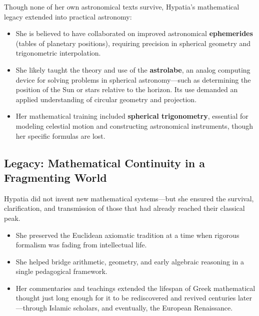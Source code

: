 Though none of her own astronomical texts survive, Hypatia’s mathematical legacy extended into practical astronomy:

\begin{itemize}
    \item She is believed to have collaborated on improved astronomical \textbf{ephemerides} (tables of planetary positions), requiring precision in spherical geometry and trigonometric interpolation.

    \item She likely taught the theory and use of the \textbf{astrolabe}, an analog computing device for solving problems in spherical astronomy—such as determining the position of the Sun or stars relative to the horizon. Its use demanded an applied understanding of circular geometry and projection.

    \item Her mathematical training included \textbf{spherical trigonometry}, essential for modeling celestial motion and constructing astronomical instruments, though her specific formulas are lost.
\end{itemize}

\subsection{Legacy: Mathematical Continuity in a Fragmenting World}

Hypatia did not invent new mathematical systems—but she ensured the survival, clarification, and transmission of those that had already reached their classical peak.

\begin{itemize}
    \item She preserved the Euclidean axiomatic tradition at a time when rigorous formalism was fading from intellectual life.
    \item She helped bridge arithmetic, geometry, and early algebraic reasoning in a single pedagogical framework.
    \item Her commentaries and teachings extended the lifespan of Greek mathematical thought just long enough for it to be rediscovered and revived centuries later—through Islamic scholars, and eventually, the European Renaissance.
\end{itemize}

